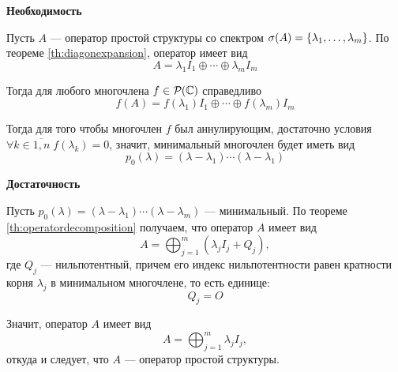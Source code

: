 \begin{proofbreak}
    \dindent \textbf{Необходимость}

    Пусть $A$ — оператор простой структуры со спектром $\spectrum{A} = \menge{\lambda_1,
    \dotsc, \lambda_m}$. По теореме \ref{th:diagonexpansion}, оператор
    имеет вид 
    \[ A = \lambda_1 I_1 \oplus \dotsb \oplus \lambda_m I_m \]

    Тогда для любого многочлена $f \in \polyset[\fieldc]{}$ справедливо
    \[ f(A) = f(\lambda_1) I_1 \oplus \dotsb \oplus f(\lambda_m) I_m \]

    Тогда для того чтобы многочлен $f$ был аннулирующим, достаточно условия
    $\forall k \in \overline{1,n} \; f(\lambda_k) = 0$, значит, минимальный
    многочлен будет иметь вид
    \[ p_0(\lambda) = (\lambda-\lambda_1)\dotsm(\lambda-\lambda_1) \]

    \textbf{Достаточность}

    Пусть $p_0(\lambda) = (\lambda-\lambda_1)\dotsm(\lambda-\lambda_m)$ —
    минимальный. По теореме \ref{th:operatordecomposition} получаем, что
    оператор $A$ имеет вид
    \[ A = \bigoplus_{j=1}^m (\lambda_j I_j + Q_j), \]
    где $Q_j$ — нильпотентный, причем его индекс нильпотентности равен кратности
    корня $\lambda_j$ в минимальном многочлене, то есть единице:
    \[ Q_j = O \]

    Значит, оператор $A$ имеет вид
    \[ A = \bigoplus_{j=1}^m \lambda_j I_j, \]
    откуда и следует, что $A$ — оператор простой структуры.
\end{proofbreak}


